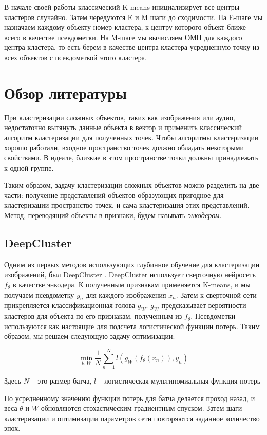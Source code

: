 \documentclass[a4paper,12pt]{extarticle}
\begin{document}
В начале своей работы классический K-means инициализирует все 
центры кластеров случайно. Затем чередуются E и M шаги до 
сходимости. На E-шаге мы назначаем каждому объекту номер
кластера, к центру которого объект ближе всего в качестве псевдометки.
На M-шаге мы вычисляем ОМП для каждого центра кластера, то есть 
берем в качестве центра кластера усредненную точку из всех объектов 
с псевдометкой этого кластера.

\section{Обзор литературы}

При кластеризации сложных объектов, таких как изображения или 
аудио, недостаточно вытянуть данные объекта в вектор и применить
классический алгоритм кластеризации для полученных точек. 
Чтобы алгоритмы кластеризации хорошо работали, входное 
пространство точек должно обладать некоторыми свойствами.
В идеале, близкие в этом пространстве точки должны принадлежать 
к одной группе.

Таким образом, задачу кластеризации сложных объектов можно 
разделить на две части: получение представлений объектов 
образующих пригодное для кластеризации пространство точек, и 
сама кластеризация этих представлений. Метод, переводящий объекты
в признаки, будем называть \textit{энкодером}.

\subsection{DeepCluster}

Одним из первых методов использующих глубинное обучение для 
кластеризации изображений, был
DeepCluster \cite{Caron_2018_ECCV}. DeepCluster использует 
сверточную нейросеть $f_\theta$ в качестве энкодера.
К полученным признакам применяется K-means, и мы получаем
псевдометку $y_n$ для каждого изображения $x_n$. Затем к 
сверточной сети прикрепляется
классификационная голова $g_W$. $g_W$ предсказывает 
вероятности кластеров для объекта по его признакам,
полученным из $f_\theta$. Псевдометки используются как настоящие для подсчета логистической 
функции потерь. Таким образом, мы решаем следующую задачу 
оптимизации:

\[
	\min_{\theta, W} \frac{1}{N}\sum_{n=1}^N 
	l(g_W(f_\theta(x_n)), y_n)
\]

Здесь $N$ -- это размер батча, $l$ -- логистическая 
мультиномиальная функция потерь

По усредненному значению функции потерь для батча делается проход назад, и веса 
$\theta$ и $W$ обновляются стохастическим градиентным спуском. Затем 
шаги кластеризации и оптимизации параметров сети повторяются 
заданное количество эпох.
\end{document}
